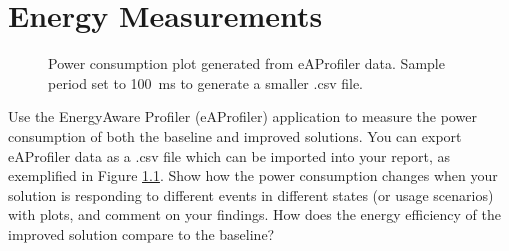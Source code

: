 \chapter{Energy Measurements}

\begin{figure}[tbph]
    \centering
    \caption{Power consumption plot generated from eAProfiler data. Sample period set to 100~ms to generate a smaller .csv file.}
    \label{fig:PowerCons}
\end{figure}
Use the EnergyAware Profiler (eAProfiler) application to measure the power consumption of both the baseline and improved solutions.
You can export eAProfiler data as a .csv file which can be imported into your report, as exemplified in Figure \ref{fig:PowerCons}.
Show how the power consumption changes when your solution is responding to different events in different states (or usage scenarios) with plots, and comment on your findings.
How does the energy efficiency of the improved solution compare to the baseline?
